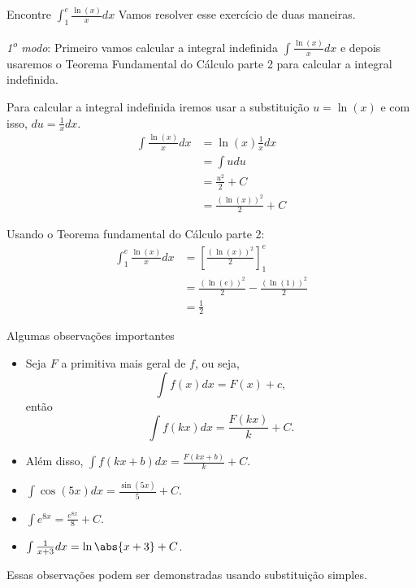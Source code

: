 \begin{example}
  Encontre \(\int_1^e \frac{\ln(x)}{x}dx\)
  \solution
  Vamos resolver esse exercício de duas maneiras.

  \emph{1\textsuperscript{o} modo}:
  Primeiro vamos calcular a integral indefinida
  $\int \frac{\ln(x)}{x} dx$ e depois usaremos o
  Teorema Fundamental do Cálculo parte 2 para
  calcular a integral indefinida.

  Para calcular a integral indefinida iremos usar a substituição
  $u=\ln(x)$ e com isso, $du= \frac{1}{x}dx$.
  \begin{align}
    \int \frac{\ln(x)}{x} dx
    & = \ln(x) \frac{1}{x} dx \\
    & = \int u du \\
    & = \frac{u^2}{2}+C \\
    & = \frac{(\ln(x))^2}{2}+C
  \end{align}

  Usando o Teorema fundamental do Cálculo parte 2:
  \begin{align*}
    \int_1^e \frac{\ln(x)}{x} dx
    & = \left[ \frac{(\ln(x))^2}{2} \right]_1^e    \\
    & = \frac{(\ln(e))^2}{2} -\frac{(\ln(1))^2}{2} \\
    & = \frac{1}{2}
  \end{align*}
\end{example}

Algumas observações importantes
\begin{itemize}
  \item Seja $F$ a primitiva mais geral de $f$, ou seja,
  \[
    \int f(x)dx= F(x)+c,
  \]
    então
  \[
    \int f(kx) dx= \frac{F(kx)}{k}+C.
  \]
  \item Além disso, \(\int f(kx+b)dx= \frac{F(kx+b)}{k}+C\).
  \item \(\int \cos(5x) dx= \frac{\sin(5x)}{5}+C\).
  \item \(\int e^{8x}= \frac{e^{8x}}{8}+C\).
  \item \(\int \frac{1}{x+3}dx= \ln\abs{x+3}+C\).
\end{itemize}
Essas observações podem ser demonstradas usando substituição simples.

